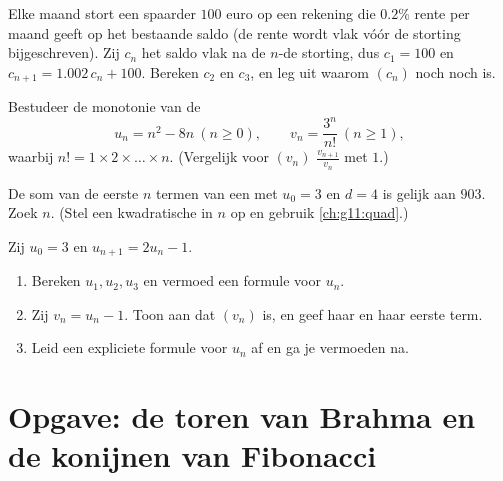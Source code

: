 \begin{exercise}[$\star\star$]\label{exo:g11:seq:8}
Elke maand stort een spaarder $100$ euro op een rekening die $0.2\%$ rente
per maand geeft op het bestaande saldo (de rente wordt vlak vóór de storting
bijgeschreven). Zij $c_n$ het saldo vlak na de $n$-de storting, dus
$c_1 = 100$ en $c_{n+1} = 1.002\,c_n + 100$. Bereken $c_2$ en $c_3$, en leg
uit waarom $(c_n)$ noch  noch  is.
\end{exercise}

\begin{exercise}[$\star\star$]\label{exo:g11:seq:9}
Bestudeer de monotonie van de 
\[
u_n = n^2 - 8n \ (n \geq 0), \qquad
v_n = \frac{3^n}{n!}\ (n \geq 1),
\]
waarbij $n! = 1 \times 2 \times \dots \times n$. (Vergelijk voor $(v_n)$
$\frac{v_{n+1}}{v_n}$ met $1$.)
\end{exercise}

\begin{exercise}[$\star\star$]\label{exo:g11:seq:10}
De som van de eerste $n$ termen van een  met $u_0 = 3$ en
$d = 4$ is gelijk aan $903$. Zoek $n$. (Stel een kwadratische  in
$n$ op en gebruik \cref{ch:g11:quad}.)
\end{exercise}

\begin{exercise}[$\star\star\star$]\label{exo:g11:seq:11}
Zij $u_0 = 3$ en $u_{n+1} = 2u_n - 1$.
\begin{enumerate}
  \item Bereken $u_1, u_2, u_3$ en vermoed een formule voor $u_n$.
  \item Zij $v_n = u_n - 1$. Toon aan dat $(v_n)$  is, en geef haar
         en haar eerste term.
  \item Leid een expliciete formule voor $u_n$ af en ga je vermoeden na.
\end{enumerate}
\end{exercise}

\section{Opgave: de toren van Brahma en de konijnen van Fibonacci}

